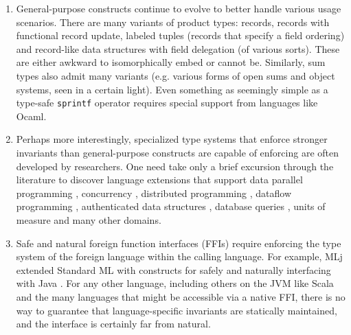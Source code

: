 \documentclass[9pt,preprint]{sigplanconf}
\newcommand{\compresslist}{
  \vspace{-1em}
  \setlength{\itemsep}{1pt}
  \setlength{\parskip}{0pt}
  \setlength{\parsep}{0pt}
}
\begin{document}
\begin{enumerate}
\item General-purpose constructs continue to evolve to better handle various usage scenarios. There are many  variants of product types: records, records with functional record update, labeled tuples (records that specify a field ordering) and record-like data structures with field delegation (of various sorts). These are  either awkward to isomorphically embed or cannot be. Similarly, sum types also admit many variants (e.g. various forms of open sums and object systems, seen in a certain light). Even something as seemingly simple as a type-safe \verb|sprintf| operator requires special support from languages like Ocaml.
\item Perhaps more interestingly, specialized type systems that enforce stronger invariants than general-purpose constructs are capable of enforcing are often developed by researchers. One need take only a brief  excursion through the literature to discover language extensions that support data parallel programming \cite{chakravarty2007data}, concurrency \cite{reppy1993concurrent}, distributed programming \cite{Murphy:2007:TDP:1793574.1793585}, dataflow programming \cite{mandel2005reactiveml}, authenticated data structures \cite{Miller:2014:ADS:2535838.2535851}, database queries \cite{Ohori:2011:MSM:2034773.2034815},  units of measure \cite{conf/cefp/Kennedy09} and many other domains.%
\item Safe and natural foreign function interfaces (FFIs) require enforcing the type system of the foreign language within the calling language. %
For example, MLj extended Standard ML with constructs for safely and naturally interfacing with Java \cite{benton1999interlanguage}. For any other language, including  others on the JVM like Scala and the many languages that might be accessible via a native FFI, there is no way to guarantee that language-specific invariants are statically maintained, and the interface is certainly far from natural.
\end{enumerate}
\end{document}
